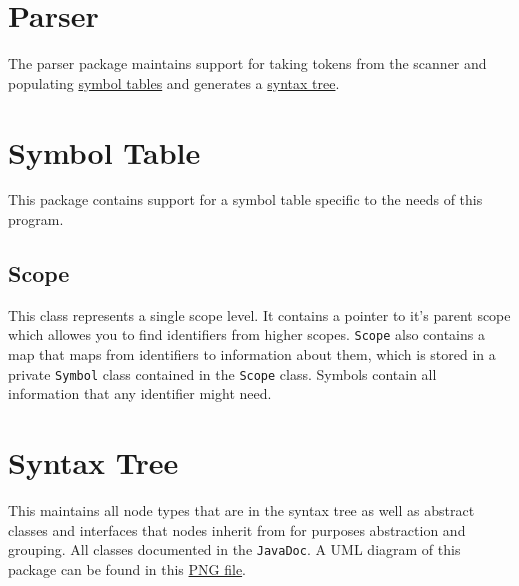 \documentclass{article}
\begin{document}
\section{Parser} \label{parser}
The parser package maintains support for taking tokens from the scanner and populating \hyperref[symboltable]{symbol tables} and generates a \hyperref[syntaxtree]{syntax tree}.

\section{Symbol Table} \label{symboltable}
This package contains support for a symbol table specific to the needs of this program.

\subsection{Scope}
This class represents a single scope level. It contains a pointer to it's parent scope which allowes you to find identifiers from higher scopes. \texttt{Scope} also contains a map that maps from identifiers to information about them, which is stored in a private \texttt{Symbol} class contained in the \texttt{Scope} class. Symbols contain all information that any identifier might need.

\section{Syntax Tree} \label{syntaxtree}
This maintains all node types that are in the syntax tree as well as abstract classes and interfaces that nodes inherit from for purposes abstraction and grouping. All classes documented in the \texttt{JavaDoc}. A UML diagram of this package can be found in this \href{\syntaxtreeUML}{PNG file}.
\end{document}
